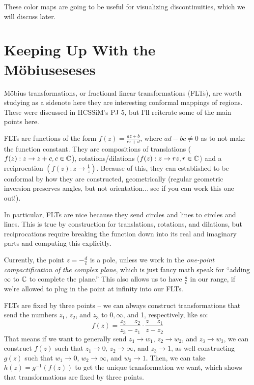 \documentclass[12pt]{scrartcl}
\begin{document}
These color maps are going to be useful for visualizing discontinuities, which we will discuss later.

\section{Keeping Up With the M\"{o}biuseseses}
M\"{o}bius transformations, or fractional linear transformations (FLTs), are worth studying as a sidenote here they are interesting conformal mappings of regions. These were discussed in HCSSiM's PJ 5, but I'll reiterate some of the main points here.

FLTs are functions of the form $f(z) = \frac{az+b}{cz+d}$, where $ad - bc \neq 0$ as to not make the function constant. They are compositions of translations ($f(z) : z \rightarrow z + c, c \in \mathbb C$), rotations/dilations ($f(z) : z \rightarrow rz, r \in \mathbb C$) and a reciprocation $\left(f(z) : z \rightarrow \frac{1}{z}\right)$. Because of this, they can established to be conformal by how they are constructed, geometrically (regular geometric inversion preserves angles, but not orientation... see if you can work this one out!).

In particular, FLTs are nice because they send circles and lines to circles and lines. This is true by construction for translations, rotations, and dilations, but reciprocations require breaking the function down into its real and imaginary parts and computing this explicitly.

Currently, the point $z = - \frac{d}{c}$ is a pole, unless we work in the \textit{one-point compactification of the complex plane}, which is just fancy math speak for ``adding $\infty$ to $\mathbb C$ to complete the plane.'' This also allows us to have $\frac{a}{c}$ in our range, if we're allowed to plug in the point at infinity into our FLTs.

FLTs are fixed by three points -- we can always construct transformations that send the numbers $z_1$, $z_2$, and $z_3$ to $0, \infty$, and 1, respectively, like so:
\[
	f(z) = \frac{z_3-z_2}{z_3-z_1} \cdot \frac{z-z_1}{z-z_2}
\]
That means if we want to generally send $z_1 \rightarrow w_1$, $z_2 \rightarrow w_2$, and $z_3 \rightarrow w_3$, we can construct $f(z)$ such that $z_1 \rightarrow 0$, $z_2 \rightarrow \infty$, and $z_3 \rightarrow 1$, as well constructing $g(z)$ such that $w_1 \rightarrow 0$, $w_2 \rightarrow \infty$, and $w_3 \rightarrow 1$. Then, we can take $h(z) = g^{-1}(f(z))$ to get the unique transformation we want, which shows that transformations are fixed by three points.
\end{document}
